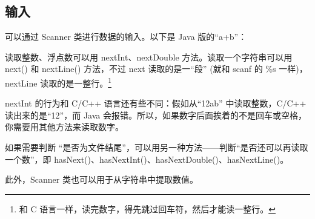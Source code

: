 \subsection{输入}
	可以通过 Scanner 类进行数据的输入。以下是 Java 版的``a+b''：
	
	
	
	读取整数、浮点数可以用 nextInt、nextDouble 方法。读取一个字符串可以用 next() 和 nextLine() 方法，不过 next 读取的是一``段'' (就和 scanf 的 \%s 一样)，nextLine 读取的是一整行。\footnote{和 C 语言一样，读完数字，得先跳过回车符，然后才能读一整行。}
	
	nextInt 的行为和 C/C++ 语言还有些不同：假如从``12ab'' 中读取整数，C/C++ 读出来的是``12''，而 Java 会报错。所以，如果数字后面挨着的不是回车或空格，你需要用其他方法来读取数字。
	
	如果需要判断 ``是否为文件结尾''，可以用另一种方法——判断``是否还可以再读取一个数''，即 hasNext()、hasNextInt()、hasNextDouble()、hasNextLine()。
	
	此外，Scanner 类也可以用于从字符串中提取数值。